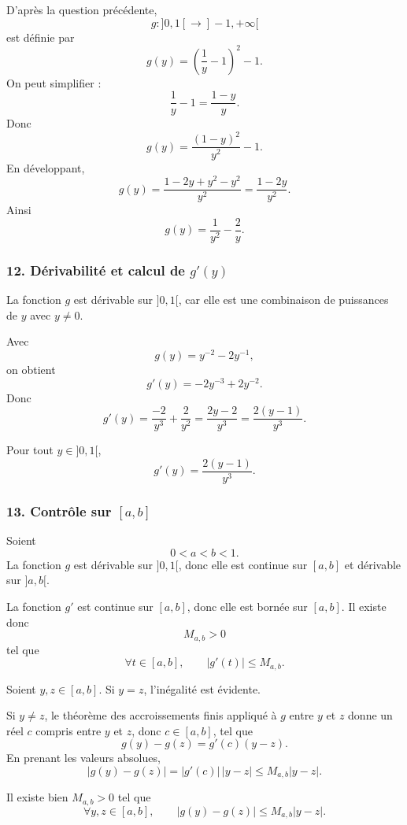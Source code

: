 \documentclass[11pt,a4paper]{article}
\begin{document}
D'après la question précédente,
\[
g: ]0,1[\longrightarrow ]-1,+\infty[
\]
est définie par
\[
g(y)=\left(\frac1y-1\right)^2-1.
\]
On peut simplifier :
\[
\frac1y-1=\frac{1-y}{y}.
\]
Donc
\[
g(y)=\frac{(1-y)^2}{y^2}-1.
\]
En développant,
\[
g(y)=\frac{1-2y+y^2-y^2}{y^2}
=
\frac{1-2y}{y^2}.
\]
Ainsi
\[
g(y)=\frac1{y^2}-\frac2y.
\]


\subsubsection*{12. Dérivabilité et calcul de \(g'(y)\)}

La fonction \(g\) est dérivable sur \(]0,1[\), car elle est une combinaison de puissances de \(y\) avec \(y\neq0\).

Avec
\[
g(y)=y^{-2}-2y^{-1},
\]
on obtient
\[
g'(y)=-2y^{-3}+2y^{-2}.
\]
Donc
\[
g'(y)=\frac{-2}{y^3}+\frac2{y^2}
=
\frac{2y-2}{y^3}
=
\frac{2(y-1)}{y^3}.
\]

\begin{resultatbox}
Pour tout \(y\in]0,1[\),
\[
g'(y)=\frac{2(y-1)}{y^3}.
\]
\end{resultatbox}


\subsubsection*{13. Contrôle sur \([a,b]\)}

Soient
\[
0<a<b<1.
\]
La fonction \(g\) est dérivable sur \(]0,1[\), donc elle est continue sur \([a,b]\) et dérivable sur \(]a,b[\).

La fonction \(g'\) est continue sur \([a,b]\), donc elle est bornée sur \([a,b]\). Il existe donc
\[
M_{a,b}>0
\]
tel que
\[
\forall t\in[a,b],
\qquad
|g'(t)|\leq M_{a,b}.
\]

Soient \(y,z\in[a,b]\). Si \(y=z\), l'inégalité est évidente.

Si \(y\neq z\), le théorème des accroissements finis appliqué à \(g\) entre \(y\) et \(z\) donne un réel \(c\) compris entre \(y\) et \(z\), donc \(c\in[a,b]\), tel que
\[
g(y)-g(z)=g'(c)(y-z).
\]
En prenant les valeurs absolues,
\[
|g(y)-g(z)|
=
|g'(c)|\,|y-z|
\leq
M_{a,b}|y-z|.
\]

\begin{resultatbox}
Il existe bien \(M_{a,b}>0\) tel que
\[
\forall y,z\in[a,b],
\qquad
|g(y)-g(z)|\leq M_{a,b}|y-z|.
\]
\end{resultatbox}
\end{document}
